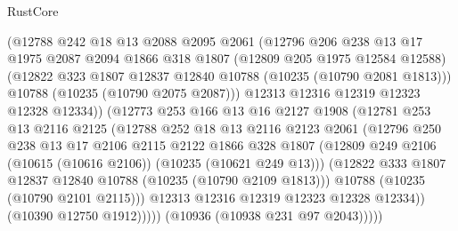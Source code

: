 \begin{lexlean}{RustCore}
\begin{coremodule}
                        (@12788
                          @242
                          @18
                          @13
                          @2088
                          @2095
                          @2061
                          (@12796
                            @206
                            @238
                            @13
                            @17
                            @1975
                            @2087
                            @2094
                            @1866
                            @318
                            @1807
                            (@12809 @205 @1975 @12584 @12588)
                            (@12822 @323 @1807 @12837 @12840 @10788 (@10235 (@10790 @2081 @1813)))
                            @10788
                            (@10235 (@10790 @2075 @2087)))
                          @12313
                          @12316
                          @12319
                          @12323
                          @12328
                          @12334))
                      (@12773
                        @253
                        @166
                        @13
                        @16
                        @2127
                        @1908
                        (@12781
                          @253
                          @13
                          @2116
                          @2125
                          (@12788
                            @252
                            @18
                            @13
                            @2116
                            @2123
                            @2061
                            (@12796
                              @250
                              @238
                              @13
                              @17
                              @2106
                              @2115
                              @2122
                              @1866
                              @328
                              @1807
                              (@12809 @249 @2106 (@10615 (@10616 @2106)) (@10235 (@10621 @249 @13)))
                              (@12822 @333 @1807 @12837 @12840 @10788 (@10235 (@10790 @2109 @1813)))
                              @10788
                              (@10235 (@10790 @2101 @2115)))
                            @12313
                            @12316
                            @12319
                            @12323
                            @12328
                            @12334))
                        (@10390 @12750 @1912)))))
                (@10936 (@10938 @231 @97 @2043)))))

\end{coremodule}
\end{lexlean}
